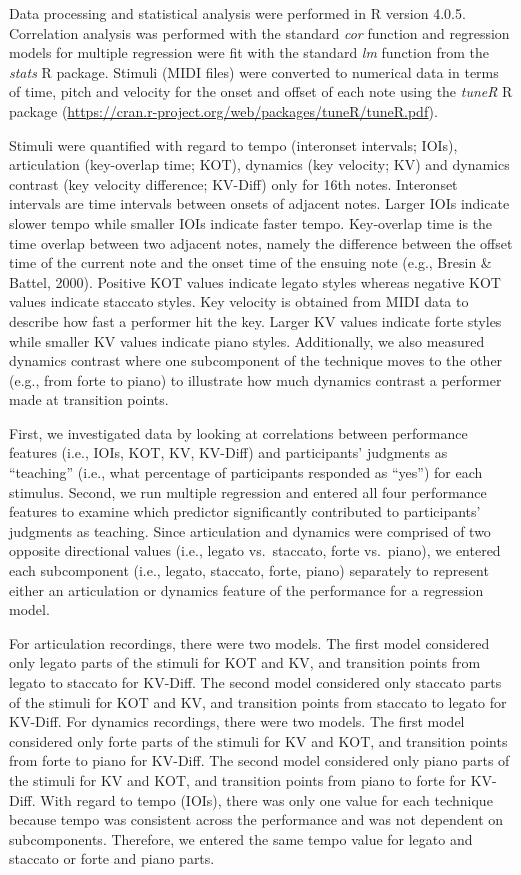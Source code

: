 \documentclass[
  man,floatsintext]{apa6}
\begin{document}
Data processing and statistical analysis were performed in R version 4.0.5. Correlation analysis was performed with the standard \emph{cor} function and regression models for multiple regression were fit with the standard \emph{lm} function from the \emph{stats} R package. Stimuli (MIDI files) were converted to numerical data in terms of time, pitch and velocity for the onset and offset of each note using the \emph{tuneR} R package (\url{https://cran.r-project.org/web/packages/tuneR/tuneR.pdf}).

Stimuli were quantified with regard to tempo (interonset intervals; IOIs), articulation (key-overlap time; KOT), dynamics (key velocity; KV) and dynamics contrast (key velocity difference; KV-Diff) only for 16th notes. Interonset intervals are time intervals between onsets of adjacent notes. Larger IOIs indicate slower tempo while smaller IOIs indicate faster tempo. Key-overlap time is the time overlap between two adjacent notes, namely the difference between the offset time of the current note and the onset time of the ensuing note (e.g., Bresin \& Battel, 2000). Positive KOT values indicate legato styles whereas negative KOT values indicate staccato styles. Key velocity is obtained from MIDI data to describe how fast a performer hit the key. Larger KV values indicate forte styles while smaller KV values indicate piano styles. Additionally, we also measured dynamics contrast where one subcomponent of the technique moves to the other (e.g., from forte to piano) to illustrate how much dynamics contrast a performer made at transition points.

First, we investigated data by looking at correlations between performance features (i.e., IOIs, KOT, KV, KV-Diff) and participants' judgments as ``teaching'' (i.e., what percentage of participants responded as ``yes'') for each stimulus. Second, we run multiple regression and entered all four performance features to examine which predictor significantly contributed to participants' judgments as teaching. Since articulation and dynamics were comprised of two opposite directional values (i.e., legato vs.~staccato, forte vs.~piano), we entered each subcomponent (i.e., legato, staccato, forte, piano) separately to represent either an articulation or dynamics feature of the performance for a regression model.

For articulation recordings, there were two models. The first model considered only legato parts of the stimuli for KOT and KV, and transition points from legato to staccato for KV-Diff. The second model considered only staccato parts of the stimuli for KOT and KV, and transition points from staccato to legato for KV-Diff. For dynamics recordings, there were two models. The first model considered only forte parts of the stimuli for KV and KOT, and transition points from forte to piano for KV-Diff. The second model considered only piano parts of the stimuli for KV and KOT, and transition points from piano to forte for KV-Diff. With regard to tempo (IOIs), there was only one value for each technique because tempo was consistent across the performance and was not dependent on subcomponents. Therefore, we entered the same tempo value for legato and staccato or forte and piano parts.
\end{document}
